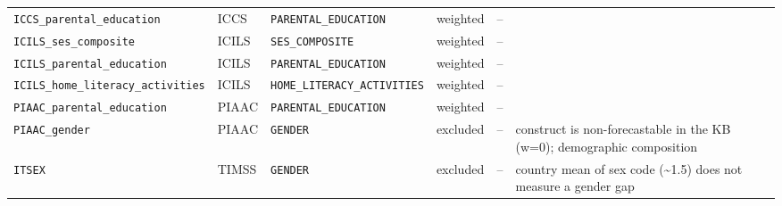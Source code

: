{\begin{longtable}{lllllp{5cm}}
\texttt{ICCS\_parental\_education} & ICCS & \texttt{PARENTAL\_EDUCATION} & weighted & -- &  \\
\texttt{ICILS\_ses\_composite} & ICILS & \texttt{SES\_COMPOSITE} & weighted & -- &  \\
\texttt{ICILS\_parental\_education} & ICILS & \texttt{PARENTAL\_EDUCATION} & weighted & -- &  \\
\texttt{ICILS\_home\_literacy\_activities} & ICILS & \texttt{HOME\_LITERACY\_ACTIVITIES} & weighted & -- &  \\
\texttt{PIAAC\_parental\_education} & PIAAC & \texttt{PARENTAL\_EDUCATION} & weighted & -- &  \\
\texttt{PIAAC\_gender} & PIAAC & \texttt{GENDER} & excluded & -- & construct is non-forecastable in the KB (w=0); demographic composition \\
\texttt{ITSEX} & TIMSS & \texttt{GENDER} & excluded & -- & country mean of sex code (\textasciitilde{}1.5) does not measure a gender gap \\
\end{longtable}

}
